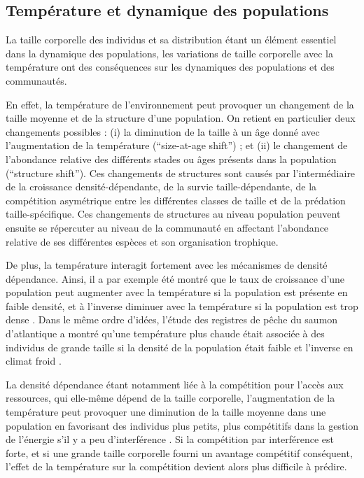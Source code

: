 \subsection{Température et dynamique des populations}

La taille corporelle des individus et sa distribution étant un élément essentiel
dans la dynamique des populations, les variations de taille corporelle avec la
température ont des conséquences sur les dynamiques des populations et des
communautés. 

En effet, la température de l'environnement peut provoquer un changement de la
taille moyenne et de la structure d'une population. On retient en particulier
deux changements possibles : (i) la diminution de la taille à un âge donné avec
l'augmentation de la température (``size-at-age shift'') ; et (ii) le
changement de l'abondance relative des différents stades ou âges présents dans
la population (``structure shift''). Ces changements de structures sont causés
par l'intermédiaire de la croissance densité-dépendante, de la survie
taille-dépendante, de la compétition asymétrique entre les différentes
classes de taille et de la prédation taille-spécifique. Ces changements de
structures au niveau population peuvent ensuite se répercuter au niveau de la
communauté en affectant l'abondance relative de ses différentes espèces et son
organisation trophique. 

De plus, la température interagit fortement avec les mécanismes de densité
dépendance. Ainsi, il a par exemple été montré que le taux de croissance d'une
population peut augmenter avec la température si la population est présente en
faible densité, et à l'inverse diminuer avec la température si la population est
trop dense \autocites[chez le saumon royal][]{crozier2010a}. Dans le même
ordre d'idées, l'étude des registres de pêche du saumon d'atlantique a montré
qu'une température plus chaude était associée à des individus de grande taille si la
densité de la population était faible et l'inverse en climat froid
\autocites{huusko2012a}. 

La densité dépendance étant notamment liée à la compétition pour l'accès aux
ressources, qui elle-même dépend de la taille corporelle, l'augmentation de la
température peut provoquer une diminution de la taille moyenne dans une
population en favorisant des individus plus petits, plus compétitifs dans la
gestion de l'énergie s'il y a peu d'interférence
\autocites{persson1998a,ohlberger2012a}. Si la compétition par interférence est
forte, et si une grande taille corporelle fourni un avantage compétitif
conséquent, l'effet de la température sur la compétition devient alors plus difficile à
prédire.

